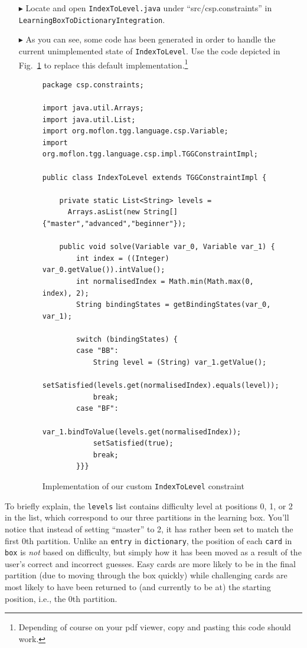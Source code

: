 \begin{itemize}
\item[$\blacktriangleright$] Locate and open \texttt{IndexToLevel.java} under ``src/csp.constraints'' in \texttt{LearningBoxToDictionaryIntegration}.

\item[$\blacktriangleright$] As you can see, some code has been generated in order to handle the current unimplemented state of \texttt{IndexToLevel}. 
Use the code depicted in Fig.~\ref{code:indexToLevel} to replace this default implementation.\footnote{Depending of course on your pdf viewer, copy and pasting this code should work.}

\begin{figure}[htb]
\begin{verbatim}
package csp.constraints;

import java.util.Arrays;
import java.util.List;
import org.moflon.tgg.language.csp.Variable;
import org.moflon.tgg.language.csp.impl.TGGConstraintImpl;

public class IndexToLevel extends TGGConstraintImpl {

    private static List<String> levels = 
      Arrays.asList(new String[] {"master","advanced","beginner"});

    public void solve(Variable var_0, Variable var_1) {
        int index = ((Integer) var_0.getValue()).intValue();
        int normalisedIndex = Math.min(Math.max(0, index), 2);
        String bindingStates = getBindingStates(var_0, var_1);
        
        switch (bindingStates) {
        case "BB":
            String level = (String) var_1.getValue();
            setSatisfied(levels.get(normalisedIndex).equals(level));
            break;
        case "BF":
            var_1.bindToValue(levels.get(normalisedIndex));
            setSatisfied(true);
            break;
        }}}
\end{verbatim}
  \caption{Implementation of our custom \texttt{IndexToLevel} constraint}
  \label{code:indexToLevel}
\end{figure}

\end{itemize}

To briefly explain, the \texttt{levels} list contains difficulty level at positions 0, 1, or 2 in the list, which correspond to our three partitions in the learning box. 
You'll notice that instead of setting ``master'' to 2, it has rather been set to match the first 0th partition. 
Unlike an \texttt{entry} in \texttt{dictionary}, the position of each \texttt{card} in \texttt{box} is \emph{not} based on difficulty, but simply how it has been moved as a result of the user's correct and incorrect guesses. 
Easy cards are more likely to be in the final partition (due to moving through the box quickly) while challenging cards are most likely to have been returned to (and currently to be at) the starting position, i.e., the 0th partition.

